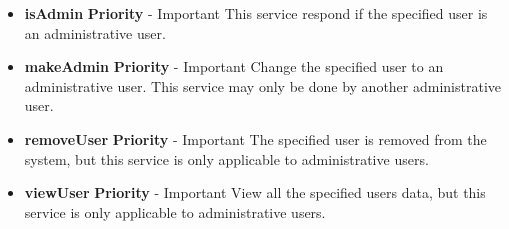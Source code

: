 \documentclass[a4paper,12pt,titlepage]{article}
\begin{document}
		\begin{itemize}
			\item \textbf{isAdmin}
				\newline\textbf{ Priority } - Important
				\newline This service respond if the specified user is an administrative user.
			\item \textbf{makeAdmin}
				\newline\textbf{ Priority } - Important
				\newline Change the specified user to an administrative user. This service may only be done by another administrative user.

			\item \textbf{removeUser}
				\newline\textbf{ Priority } - Important
				\newline The specified user is removed from the system, but this service is only applicable to administrative users. 
			\item \textbf{viewUser}
				\newline\textbf{ Priority } - Important
				\newline View all the specified users data, but this service is only applicable to administrative users. 

		\end{itemize}
\end{document}
